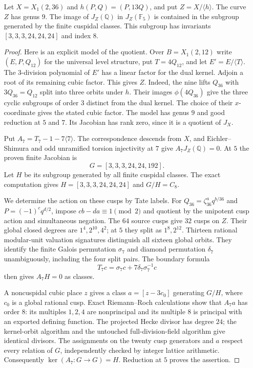 \begin{lemma}\label{lem:decic236-quotient-image}
Let $X=X_1(2,36)$ and $h(P,Q)=(P,13Q)$, and put
$Z=X/\langle h\rangle$. The curve $Z$ has genus $9$.
The image of $J_Z(\mathbb Q)$ in $J_Z(\mathbb F_5)$ is contained
in the subgroup generated by the finite cuspidal classes. This
subgroup has invariants $[3,3,3,24,24,24]$ and index $8$.
\end{lemma}
\begin{proof}
Here is an explicit model of the quotient. Over $B=X_1(2,12)$
write $(E,P,Q_{12})$ for the universal level structure, put
$T=4Q_{12}$, and let $E'=E/\langle T\rangle$.
The $3$-division polynomial of $E'$ has a linear factor for the
dual kernel. Adjoin a root of its remaining cubic factor.
This gives $Z$.
Indeed, the nine lifts $Q_{36}$ with $3Q_{36}=Q_{12}$ split into
three orbits under $h$. Their images $\phi(4Q_{36})$ give the three cyclic subgroups of
order $3$ distinct from the dual kernel.
The choice of their $x$-coordinate gives the stated cubic factor.
The model has genus $9$ and good reduction at $5$ and $7$.
Its Jacobian has rank zero, since it is a quotient of $J_X$.

Put $A_7=T_7-1-7\langle7\rangle$.
The correspondence descends from $X$, and Eichler--Shimura and
odd unramified torsion injectivity at $7$ give
$A_7J_Z(\mathbb Q)=0$.
At $5$ the proven finite Jacobian is
\[
 G=[3,3,3,24,24,192].
\]
Let $H$ be its subgroup generated by all finite cuspidal classes.
The exact computation gives $H=[3,3,3,24,24,24]$ and $G/H=C_8$.

We determine the action on these cusps by Tate labels.
For $Q_{36}=\zeta_{36}^a q^{b/36}$ and
$P=(-1)^c q^{d/2}$, impose $cb-da\equiv1\pmod2$ and quotient
by the unipotent cusp action and simultaneous negation.
The $64$ source cusps give $32$ cusps on $Z$.
Their global closed degrees are $1^4,2^{10},4^2$; at $5$ they
split as $1^8,2^{12}$.
Thirteen rational modular-unit valuation signatures distinguish
all sixteen global orbits. They identify the finite Galois
permutation $\sigma_7$ and diamond permutation $\delta_7$
unambiguously, including the four split pairs.
The boundary formula
\[
 T_7c=\sigma_7c+7\delta_7\sigma_7^{-1}c
\]
then gives $A_7H=0$ as classes.

A noncuspidal cubic place $z$ gives a class
$a=[z-3c_0]$ generating $G/H$, where $c_0$ is a global rational
cusp. Exact Riemann--Roch calculations show that $A_7a$ has order
$8$: its multiples $1,2,4$ are nonprincipal and its multiple $8$
is principal with an exported defining function.
The projected Hecke divisor has degree $24$; the kernel-orbit
algorithm and the untouched full-division-field algorithm give
identical divisors. The assignments on the twenty cusp generators
and $a$ respect every relation of $G$, independently checked by
integer lattice arithmetic. Consequently
$\ker(A_7:G\to G)=H$.
Reduction at $5$ proves the assertion.
\end{proof}

